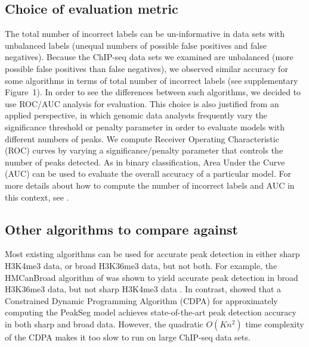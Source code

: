 \documentclass[aoas]{imsart}
\begin{document}
\subsection{Choice of evaluation metric}

The total
number of incorrect labels can be un-informative in data sets with
unbalanced labels (unequal numbers of possible false positives and
false negatives). Because the ChIP-seq data sets we examined are
unbalanced (more possible false positives than false negatives), we
observed similar accuracy for some algorithms in terms of total number
of incorrect labels (see supplementary Figure~1). In order to see the
differences between such algorithms, we decided to use ROC/AUC
analysis for evaluation. This choice is also justified from an applied
perspective, in which genomic data analysts frequently vary the
significance threshold or penalty parameter in order to evaluate
models with different numbers of peaks. We compute Receiver Operating
Characteristic (ROC) curves by varying a significance/penalty
parameter that controls the number of peaks detected. As in binary
classification, Area Under the Curve (AUC) can be used to evaluate the
overall accuracy of a particular model. For more details about how to
compute the number of incorrect labels and AUC in this context, see
\citep{HOCKING2016-chipseq}.

\subsection{Other algorithms to compare against}
 
Most existing algorithms can be used for accurate peak detection in
either sharp H3K4me3 data, or broad H3K36me3 data, but not both. For
example, the HMCanBroad algorithm of \citet{HMCan} was shown to yield
accurate peak detection in broad H3K36me3 data, but not sharp H3K4me3
data \citep{HOCKING2016-chipseq}. In contrast, \citet{HOCKING-PeakSeg}
showed that a Constrained Dynamic Programming Algorithm (CDPA) for
approximately computing the PeakSeg model achieves state-of-the-art
peak detection accuracy in both sharp and broad data. However, the
quadratic $O(Kn^2)$ time complexity of the CDPA makes it too slow to
run on large ChIP-seq data sets.
\end{document}
